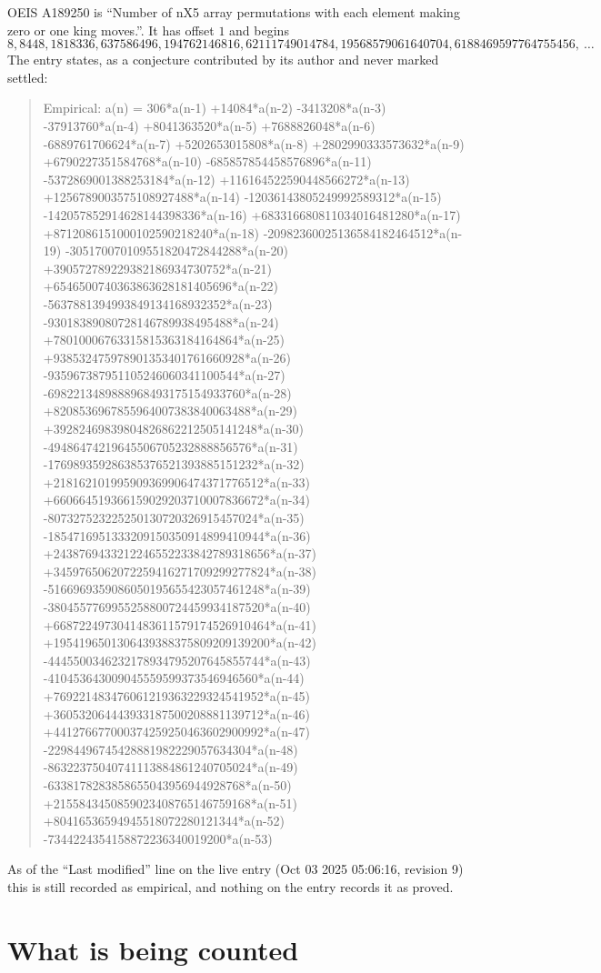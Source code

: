 \documentclass[11pt,a4paper]{article}
\theoremstyle{plain}
\theoremstyle{definition}
\begin{document}
OEIS A189250 is ``Number of nX5 array permutations with each element making zero or one king moves.''. It has offset $1$ and begins
\[
8, 8448, 1818336, 637586496, 194762146816, 62111749014784, 19568579061640704, 6188469597764755456,\ \dots
\]
The entry states, as a conjecture contributed by its author and never marked settled:
\begin{quote}
Empirical: a(n) = 306*a(n-1) +14084*a(n-2) -3413208*a(n-3) -37913760*a(n-4) +8041363520*a(n-5) +7688826048*a(n-6) -6889761706624*a(n-7) +5202653015808*a(n-8) +2802990333573632*a(n-9) +6790227351584768*a(n-10) -685857854458576896*a(n-11) -5372869001388253184*a(n-12) +116164522590448566272*a(n-13) +1256789003575108927488*a(n-14) -12036143805249992589312*a(n-15) -142057852914628144398336*a(n-16) +683316680811034016481280*a(n-17) +8712086151000102590218240*a(n-18) -20982360025136584182464512*a(n-19) -305170070109551820472844288*a(n-20) +390572789229382186934730752*a(n-21) +6546500740363863628181405696*a(n-22) -5637881394993849134168932352*a(n-23) -93018389080728146789938495488*a(n-24) +78010006763315815363184164864*a(n-25) +938532475978901353401761660928*a(n-26) -935967387951105246060341100544*a(n-27) -6982213489888968493175154933760*a(n-28) +8208536967855964007383840063488*a(n-29) +39282469839804826862212505141248*a(n-30) -49486474219645506705232888856576*a(n-31) -176989359286385376521393885151232*a(n-32) +218162101995909369906474371776512*a(n-33) +660664519366159029203710007836672*a(n-34) -807327523225250130720326915457024*a(n-35) -1854716951333209150350914899410944*a(n-36) +2438769433212246552233842789318656*a(n-37) +3459765062072259416271709299277824*a(n-38) -5166969359086050195655423057461248*a(n-39) -3804557769955258800724459934187520*a(n-40) +6687224973041483611579174526910464*a(n-41) +1954196501306439388375809209139200*a(n-42) -4445500346232178934795207645855744*a(n-43) -410453643009045559599373546946560*a(n-44) +769221483476061219363229324541952*a(n-45) +360532064443933187500208881139712*a(n-46) +441276677000374259250463602900992*a(n-47) -22984496745428881982229057634304*a(n-48) -86322375040741113884861240705024*a(n-49) -6338178283858655043956944928768*a(n-50) +2155843450859023408765146759168*a(n-51) +80416536594945518072280121344*a(n-52) -7344224354158872236340019200*a(n-53)
\end{quote}
As of the ``Last modified'' line on the live entry (Oct 03 2025 05:06:16, revision 9) this is still
recorded as empirical, and nothing on the entry records it as proved.

\section{What is being counted}
\end{document}
